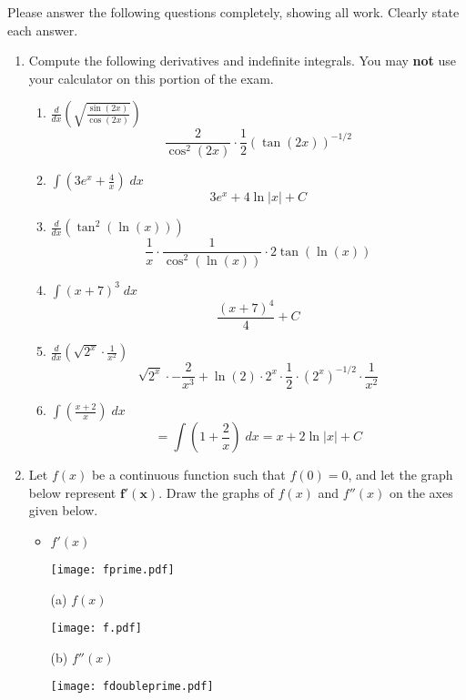 \documentclass[11pt]{article}
\newcommand{\ds}{\displaystyle}
\begin{document}
\drawtitle

\noindent Please answer the following questions completely, showing all work. Clearly
state each answer.

\begin{enumerate}
\item Compute the following derivatives and indefinite integrals.  You
  may \textbf{not} use your calculator on this portion of the exam.
  \begin{enumerate}
  \item $\ds\frac{d}{dx}\left(\sqrt{\frac{\sin(2x)}{\cos(2x)}}\right)$
    \vfill
    \[
    \frac{2}{\cos^2(2x)}\cdot\frac{1}{2}(\tan(2x))^{-1/2}
    \]
    \vfill
  \item $\ds\int\left(3e^x+\frac{4}{x}\right)\;dx$
    \vfill
    \[
    3e^x+4\ln|x|+C
    \]
    \vfill
    \newpage
  \item $\ds\frac{d}{dx}\left(\tan^2\left(\ln\left(
          x\right)\right)\right)$
    \vfill
    \[
    \frac{1}{x}\cdot\frac{1}{\cos^2(\ln(x))}\cdot 2\tan(\ln(x))
    \]
    \vfill
  \item $\ds\int\left(x+7\right)^3\;dx$
    \vfill
    \[
    \frac{(x+7)^4}{4}+C
    \]
    \vfill
    \newpage
  \item $\ds\frac{d}{dx}\left(\sqrt{2^x}\cdot \frac{1}{x^2}\right)$
    \vfill
    \[
    \sqrt{2^x}\cdot-\frac{2}{x^3}+\ln(2)\cdot2^x\cdot\frac{1}{2}\cdot
    (2^x)^{-1/2}\cdot\frac{1}{x^2}
    \]
    \vfill
  \item $\ds\int\left(\frac{x+2}{x}\right)\;dx$
    \vfill
    \[
    =\int\left(1+\dfrac{2}{x}\right)\;dx=x+2\ln|x|+C
    \]
    \vfill
  \end{enumerate}

  \newpage
  
\item Let $f(x)$ be a continuous function such that $f(0)=0$, and let
  the graph below represent $\mathbf{f'(x)}$.  Draw the graphs of
  $f(x)$ and $f''(x)$ on the axes given below.
  \begin{itemize}
  \item $f'(x)$
    \begin{center}
      \texttt{[image: fprime.pdf]}
    \end{center}
    \vfill
  \item[(a)] $f(x)$
    \begin{center}
      \texttt{[image: f.pdf]}
    \end{center}
    \vfill
  \item[(b)] $f''(x)$
    \begin{center}
      \texttt{[image: fdoubleprime.pdf]}
    \end{center}
    \vfill
  \end{itemize}


\end{enumerate}
\end{document}
